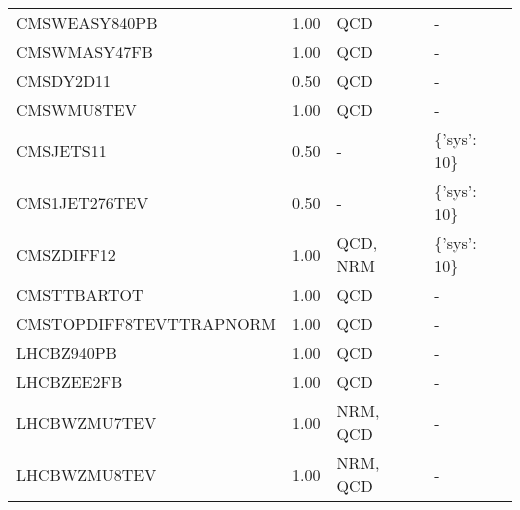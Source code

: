 \begin{center}
{\begin{tabular}{lrll}
        CMSWEASY840PB            &               1.00 &       QCD &            - \\
        CMSWMASY47FB             &               1.00 &       QCD &            - \\
        CMSDY2D11                &               0.50 &       QCD &            - \\
        CMSWMU8TEV               &               1.00 &       QCD &            - \\
        CMSJETS11                &               0.50 &         - &  \{'sys': 10\} \\
        CMS1JET276TEV            &               0.50 &         - &  \{'sys': 10\} \\
        CMSZDIFF12               &               1.00 &  QCD, NRM &  \{'sys': 10\} \\
        CMSTTBARTOT              &               1.00 &       QCD &            - \\
        CMSTOPDIFF8TEVTTRAPNORM  &               1.00 &       QCD &            - \\
        LHCBZ940PB               &               1.00 &       QCD &            - \\
        LHCBZEE2FB               &               1.00 &       QCD &            - \\
        LHCBWZMU7TEV             &               1.00 &  NRM, QCD &            - \\
        LHCBWZMU8TEV             &               1.00 &  NRM, QCD &            - \\
        \bottomrule
        \end{tabular}}
\end{center}